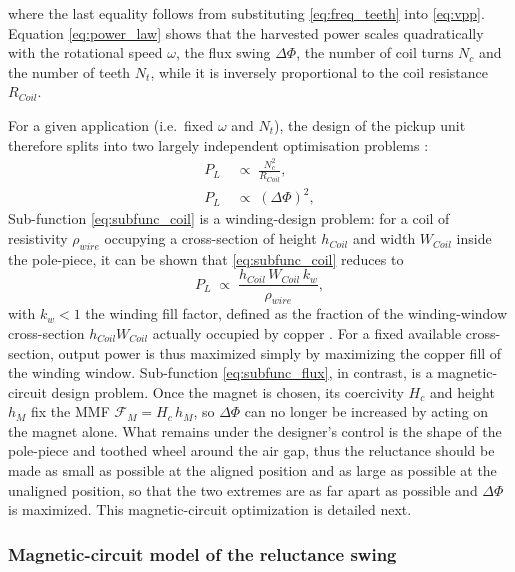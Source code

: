 where the last equality follows from substituting \eqref{eq:freq_teeth} into \eqref{eq:vpp}. Equation \eqref{eq:power_law} shows that the harvested power scales quadratically with the rotational speed $\omega$, the flux swing $\Delta\Phi$, the number of coil turns $N_c$ and the number of teeth $N_t$, while it is inversely proportional to the coil resistance $R_{Coil}$.

For a given application (i.e.\ fixed $\omega$ and $N_t$), the design of the pickup unit therefore splits into two largely independent optimisation problems \cite{xuDesignModelingOptimization2019a}:
\begin{subequations}
\begin{align}
    P_L &\;\propto\; \frac{N_c^2}{R_{Coil}}, \label{eq:subfunc_coil}\\
    P_L &\;\propto\; (\Delta\Phi)^2, \label{eq:subfunc_flux}
\end{align}
\end{subequations}
Sub-function \eqref{eq:subfunc_coil} is a winding-design problem: for a coil of resistivity $\rho_{wire}$ occupying a cross-section of height $h_{Coil}$ and width $W_{Coil}$ inside the pole-piece, it can be shown that \eqref{eq:subfunc_coil} reduces to \cite{xuDesignModelingOptimization2019a}
\begin{equation}
    P_L \;\propto\; \frac{h_{Coil}\,W_{Coil}\,k_w}{\rho_{wire}},
    \label{eq:coil_appendixA}
\end{equation}
with $k_w<1$ the winding fill factor, defined as the fraction of the winding-window cross-section $h_{Coil}W_{Coil}$ actually occupied by copper \cite{xuDesignModelingOptimization2019a}. For a fixed available cross-section, output power is thus maximized simply by maximizing the copper fill of the winding window. Sub-function \eqref{eq:subfunc_flux}, in contrast, is a magnetic-circuit design problem. Once the magnet is chosen, its coercivity $H_c$ and height $h_M$ fix the MMF $\mathcal{F}_M = H_c\,h_M$, so $\Delta\Phi$ can no longer be increased by acting on the magnet alone. What remains under the designer's control is the shape of the pole-piece and toothed wheel around the air gap, thus the reluctance should be made as small as possible at the aligned position and as large as possible at the unaligned position, so that the two extremes are as far apart as possible and $\Delta\Phi$ is maximized. This magnetic-circuit optimization is detailed next.

\subsubsection*{Magnetic-circuit model of the reluctance swing}

